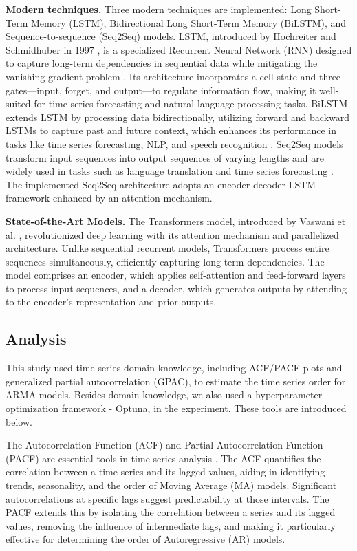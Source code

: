 \documentclass[sn-mathphys-num]{sn-jnl}
\theoremstyle{thmstyleone}%
\theoremstyle{thmstyletwo}%
\theoremstyle{thmstylethree}%
\begin{document}
\textbf{Modern techniques.}
Three modern techniques are implemented: Long Short-Term Memory (LSTM), Bidirectional Long Short-Term Memory (BiLSTM), and Sequence-to-sequence (Seq2Seq) models. 
LSTM, introduced by Hochreiter and Schmidhuber in 1997 \cite{hochreiter1997lstm}, is a specialized Recurrent Neural Network (RNN) designed to capture long-term dependencies in sequential data while mitigating the vanishing gradient problem \cite{medsker2001recurrent}. Its architecture incorporates a cell state and three gates—input, forget, and output—to regulate information flow, making it well-suited for time series forecasting and natural language processing tasks. BiLSTM extends LSTM by processing data bidirectionally, utilizing forward and backward LSTMs to capture past and future context, which enhances its performance in tasks like time series forecasting, NLP, and speech recognition \cite{graves2005framewise}. Seq2Seq models transform input sequences into output sequences of varying lengths and are widely used in tasks such as language translation and time series forecasting \cite{bahdanau2014neural}. The implemented Seq2Seq architecture adopts an encoder-decoder LSTM framework enhanced by an attention mechanism.

\textbf{State-of-the-Art Models.} The Transformers model, introduced by Vaswani et al. \cite{vaswani2017attention}, revolutionized deep learning with its attention mechanism and parallelized architecture. Unlike sequential recurrent models, Transformers process entire sequences simultaneously, efficiently capturing long-term dependencies. The model comprises an encoder, which applies self-attention and feed-forward layers to process input sequences, and a decoder, which generates outputs by attending to the encoder’s representation and prior outputs.

\subsection{Analysis}
This study used time series domain knowledge, including ACF/PACF plots and generalized partial autocorrelation (GPAC), to estimate the time series order for ARMA models. Besides domain knowledge, we also used a hyperparameter optimization framework - Optuna, in the experiment. These tools are introduced below. 

The Autocorrelation Function (ACF) and Partial Autocorrelation Function (PACF) are essential tools in time series analysis \cite{box2015time, hyndman2018forecasting, chatfield2019analysis}. The ACF quantifies the correlation between a time series and its lagged values, aiding in identifying trends, seasonality, and the order of Moving Average (MA) models. Significant autocorrelations at specific lags suggest predictability at those intervals. The PACF extends this by isolating the correlation between a series and its lagged values, removing the influence of intermediate lags, and making it particularly effective for determining the order of Autoregressive (AR) models.
\end{document}
